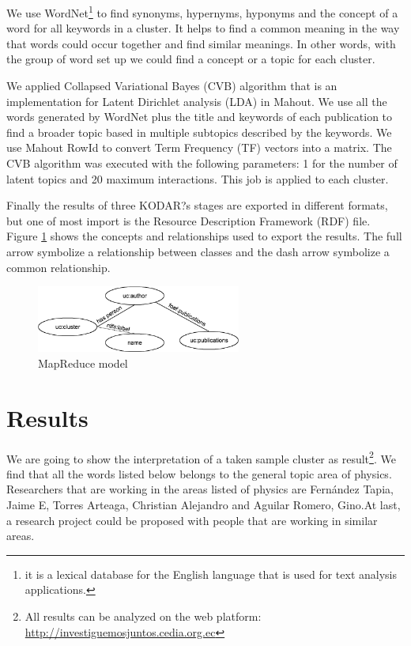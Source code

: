 \documentclass[11pt]{article}
\begin{document}
We use WordNet\footnote{it is a lexical database for the English language that is used for text analysis applications.} \cite{FellbaumB98}  \cite{smith:99} \cite{wordnet:01} to find synonyms, hypernyms, hyponyms and the concept of a word for all keywords in a cluster. It helps to find a common meaning in the way that words could occur together and find similar meanings. In other words, with the group of word set up we could find a concept or a topic for each cluster.

We applied Collapsed Variational Bayes (CVB) algorithm that is an implementation for Latent Dirichlet analysis (LDA) in Mahout. We use all the words generated by WordNet plus the title and keywords of each publication to find a broader topic based in multiple subtopics described by the keywords. We use Mahout RowId to convert Term Frequency (TF) vectors into a matrix. The CVB algorithm was executed with the following parameters: 1 for the number of latent topics and 20 maximum interactions. This job is applied to each cluster.

Finally the results of three KODAR?s stages are exported in different formats, but one of most import is the Resource Description Framework (RDF) file. Figure \ref{fig:Escudo2} shows the concepts and relationships used to export the results. The full arrow symbolize a relationship between classes and the dash arrow symbolize a common relationship.

\begin{figure}[ht!]
	\centering
		\includegraphics[height=2.2cm]{anotacion.png}
	\caption{MapReduce model}
	\label{fig:Escudo2}
\end{figure}

\section{Results}



We are going to show the interpretation of a taken sample cluster  as result\footnote{All results can be analyzed on the web platform: \url{http://investiguemosjuntos.cedia.org.ec}}. We find that all the words listed below belongs to the general topic area of physics. Researchers that are working in the areas listed of physics are Fern\'andez Tapia, Jaime E, Torres Arteaga, Christian Alejandro and Aguilar Romero, Gino.At last, a research project could be proposed with people that are working in similar areas. 
\end{document}
